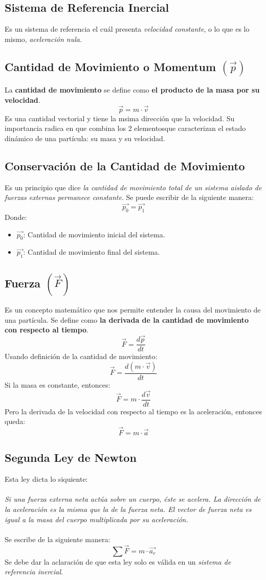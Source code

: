 \documentclass[../main.tex]{subfiles}
\begin{document}
\subsection{Sistema de Referencia Inercial}
Es un sistema de referencia el cuál presenta \textit{velocidad constante}, o lo que es lo mismo, \textit{aceleración nula}.
\subsection{Cantidad de Movimiento o Momentum \( ( \overrightarrow{p} ) \)}
La \textbf{cantidad de movimiento} se define como \textbf{el producto de la masa por su velocidad}.\cite{finn}
\[ \vec{p} = m \cdot \vec{v} \]
Es una cantidad vectorial y tiene la msima dirección que la velocidad. Su importancia radica en que combina los 2 elementosque caracterizan el estado dinámico de una partícula: su masa y su velocidad.\cite{finn}
\subsection{Conservación de la Cantidad de Movimiento}
Es un principio que dice \textit{la cantidad de movimiento total de un sistema aislado de fuerzas externas permanece constante}.
Se puede escribir de la siguiente manera:\cite{finn}
\[ \vec{p_{0}} = \vec{p_{1}} \]
Donde:
\begin{itemize}
    \item \(\vec{p_{0}}\): Cantidad de movimiento inicial del sistema.
    \item \(\vec{p_{1}}\): Cantidad de movimiento final del sistema.
\end{itemize}
\subsection{Fuerza  \( ( \overrightarrow{F} ) \)}
Es un concepto matemático que nos permite entender la causa del movimiento de una partícula. Se define como \textbf{la derivada de la cantidad de movimiento con respecto al tiempo}.\cite{finn}
\[ \vec{F} = \frac{d \vec{p}}{dt} \]
Usando definición de la cantidad de movimiento:
\[ \vec{F} = \frac{d  (m \cdot \vec{v}) }{dt} \]
Si la masa es constante, entonces:
\[ \vec{F} = m \cdot \frac{d \vec{v} }{dt} \]
Pero la derivada de la velocidad con respecto al tiempo es la aceleración, entonces queda:
\[ \vec{F}  = m \cdot \vec{a} \]

\subsection{Segunda Ley de Newton}
Esta ley dicta lo siquiente: \\ \\
\textit{Si una fuerza externa neta actúa sobre un cuerpo, éste se acelera. La dirección de la aceleración es la misma 
que la de la fuerza neta. El vector de fuerza neta es igual a la masa del cuerpo 
multiplicada por su aceleración.} \cite{sears} \\ \\
Se escribe de la siguiente manera:
\[ \sum \vec{F}  = m \cdot \vec{a_r} \]
Se debe dar la aclaración de que esta ley solo es válida en un \textit{sistema de referencia inercial}.
\end{document}
